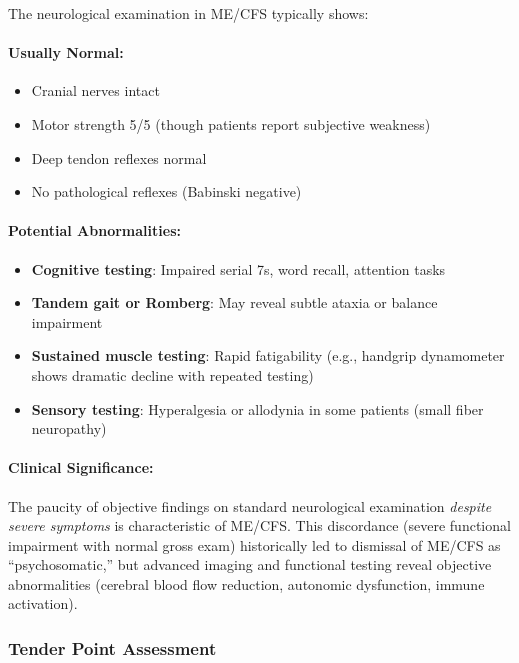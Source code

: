 \begin{observation}
\label{obs:neuro-exam}
The neurological examination in ME/CFS typically shows:

\paragraph{Usually Normal:}
\begin{itemize}
    \item Cranial nerves intact
    \item Motor strength 5/5 (though patients report subjective weakness)
    \item Deep tendon reflexes normal
    \item No pathological reflexes (Babinski negative)
\end{itemize}

\paragraph{Potential Abnormalities:}
\begin{itemize}
    \item \textbf{Cognitive testing}: Impaired serial 7s, word recall, attention tasks
    \item \textbf{Tandem gait or Romberg}: May reveal subtle ataxia or balance impairment
    \item \textbf{Sustained muscle testing}: Rapid fatigability (e.g., handgrip dynamometer shows dramatic decline with repeated testing)
    \item \textbf{Sensory testing}: Hyperalgesia or allodynia in some patients (small fiber neuropathy)
\end{itemize}

\paragraph{Clinical Significance:}
The paucity of objective findings on standard neurological examination \textit{despite severe symptoms} is characteristic of ME/CFS. This discordance (severe functional impairment with normal gross exam) historically led to dismissal of ME/CFS as ``psychosomatic,'' but advanced imaging and functional testing reveal objective abnormalities (cerebral blood flow reduction, autonomic dysfunction, immune activation).
\end{observation}

\subsubsection{Tender Point Assessment}


